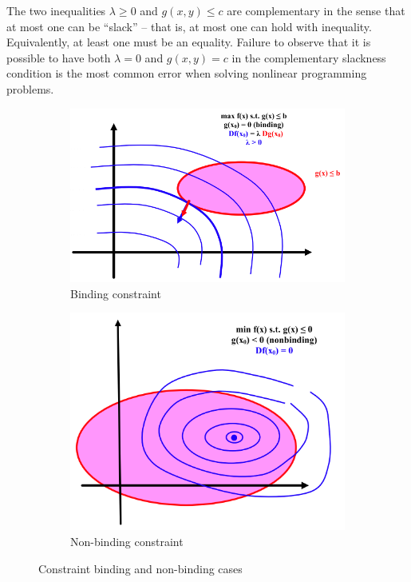 \documentclass[11pt,a4paper]{book}
\theoremstyle{definition}\newtheorem{definition}{Definition}
\theoremstyle{definition}\newtheorem{fact}{Fact}
\theoremstyle{definition}\newtheorem{remark}{Remark}
\theoremstyle{definition}\newtheorem{ex}{Ex.}
\theoremstyle{definition}\newtheorem{project}{Project}
\theoremstyle{definition}\newtheorem{problem}{Problem}
\theoremstyle{definition}\newtheorem{example}{Example}
\numberwithin{theorem}{section}
\numberwithin{corollary}{chapter}
\numberwithin{assumption}{chapter}
\numberwithin{definition}{chapter}
\numberwithin{prop}{chapter}
\numberwithin{notation}{chapter}
\numberwithin{problem}{chapter}
\numberwithin{example}{chapter}
\numberwithin{fact}{chapter}
\numberwithin{ex}{chapter}
\begin{document}
	The two inequalities $\lambda \geq 0$ and $g(x,y) \leq c$ are complementary in the sense that at most one can be “slack” -- that is, at most one can hold with inequality. Equivalently, at least one must be an equality. Failure to observe that it is possible to have both $\lambda=0$ and $g(x,y)=c$ in the complementary slackness condition is the most common error when solving nonlinear programming problems.
	
	\begin{figure}[ht]
\centering
\begin{subfigure}[b]{0.4\linewidth}
\includegraphics[width=\linewidth]{figs/binding.png}
\caption{Binding constraint}
\end{subfigure}
\begin{subfigure}[b]{0.4\linewidth}
\includegraphics[width=\linewidth]{figs/nonbinding.png}
\caption{Non-binding constraint}
\end{subfigure}
\caption{Constraint binding and non-binding cases}
\end{figure}
	
\end{document}

